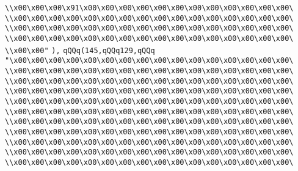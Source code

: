 \verb|\\x00\x00\x00\x91\x00\x00\x00\x00\x00\x00\x00\x00\x00\x00\x00\x00\|\newline
\verb|\\x00\x00\x00\x00\x00\x00\x00\x00\x00\x00\x00\x00\x00\x00\x00\x00\|\newline
\verb|\\x00\x00\x00\x00\x00\x00\x00\x00\x00\x00\x00\x00\x00\x00\x00\x00\|\newline
\verb|\\x00\x00\x00\x00\x00\x00\x00\x00\x00\x00\x00\x00\x00\x00\x00\x00\|\newline
\verb|\\x00\x00"|\newline
\verb|),|\newline
\verb|qQQq(145,qQQq129,qQQq|\newline
\verb|"\x00\x00\x00\x00\x00\x00\x00\x00\x00\x00\x00\x00\x00\x00\x00\x00\|\newline
\verb|\\x00\x00\x00\x00\x00\x00\x00\x00\x00\x00\x00\x00\x00\x00\x00\x00\|\newline
\verb|\\x00\x00\x00\x00\x00\x00\x00\x00\x00\x00\x00\x00\x00\x00\x00\x00\|\newline
\verb|\\x00\x00\x00\x00\x00\x00\x00\x00\x00\x00\x00\x00\x00\x00\x00\x00\|\newline
\verb|\\x00\x00\x00\x00\x00\x00\x00\x00\x00\x00\x00\x00\x00\x00\x00\x00\|\newline
\verb|\\x00\x00\x00\x00\x00\x00\x00\x00\x00\x00\x00\x00\x00\x00\x00\x00\|\newline
\verb|\\x00\x00\x00\x00\x00\x00\x00\x00\x00\x00\x00\x00\x00\x00\x00\x00\|\newline
\verb|\\x00\x00\x00\x00\x00\x00\x00\x00\x00\x00\x00\x00\x00\x00\x00\x00\|\newline
\verb|\\x00\x00\x00\x00\x00\x00\x00\x00\x00\x00\x00\x00\x00\x00\x00\x00\|\newline
\verb|\\x00\x00\x00\x00\x00\x00\x00\x00\x00\x00\x00\x00\x00\x00\x00\x00\|\newline
\verb|\\x00\x00\x00\x00\x00\x00\x00\x00\x00\x00\x00\x00\x00\x00\x00\x00\|\newline
